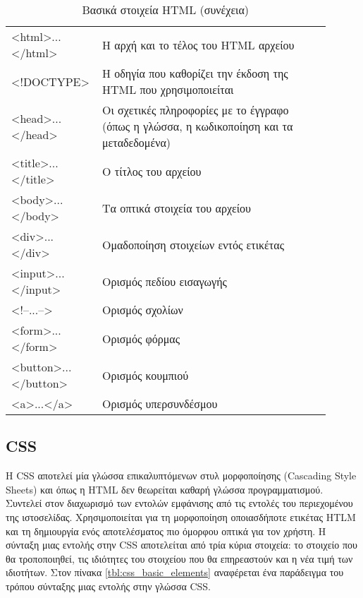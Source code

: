 \begin{longtable}{|p{0.2\linewidth}|p{0.7\linewidth}|} 
	\caption{Βασικά στοιχεία HTML} \label{tbl:html_basic_elements} \\
	\hline
	\endfirsthead
	\caption[{}]{Βασικά στοιχεία HTML (συνέχεια)} \\ 
	\endhead \endfoot 
	\textless{}html\textgreater{}...\textless{}/html\textgreater{} & Η αρχή και το τέλος του HTML αρχείου \\ \hline
	\textless{}!DOCTYPE\textgreater{} & Η οδηγία που καθορίζει την έκδοση της HTML που χρησιμοποιείται \\ \hline
	\textless{}head\textgreater{}...\textless{}/head\textgreater{} & Οι σχετικές πληροφορίες με το έγγραφο (όπως η γλώσσα, η κωδικοποίηση και τα μεταδεδομένα) \\ \hline
	\textless{}title\textgreater{}...\textless{}/title\textgreater{} & Ο τίτλος του αρχείου \\ \hline
	\textless{}body\textgreater{}...\textless{}/body\textgreater{} & Τα οπτικά στοιχεία του αρχείου \\ \hline
	\textless{}div\textgreater{}...\textless{}/div\textgreater{} & Ομαδοποίηση στοιχείων εντός ετικέτας \\ \hline
	\textless{}input\textgreater{}...\textless{}/input\textgreater{} & Ορισμός πεδίου εισαγωγής \\ \hline
	\textless{}!--...--\textgreater{} & Ορισμός σχολίων \\ \hline
	\textless{}form\textgreater{}...\textless{}/form\textgreater{} & Ορισμός φόρμας \\ \hline
	\textless{}button\textgreater{}...\textless{}/button\textgreater{} & Ορισμός κουμπιού \\ \hline
	\textless{}a\textgreater{}...\textless{}/a\textgreater{} & Ορισμός υπερσυνδέσμου \\ \hline
\end{longtable}

\subsection{CSS}
Η CSS αποτελεί μία γλώσσα επικαλυπτόμενων στυλ μορφοποίησης (Cascading Style Sheets) και όπως η HTML δεν θεωρείται καθαρή γλώσσα προγραμματισμού. Συντελεί στον διαχωρισμό των εντολών εμφάνισης από τις εντολές του περιεχομένου της ιστοσελίδας. Χρησιμοποιείται για τη μορφοποίηση οποιασδήποτε ετικέτας HTLM και τη δημιουργία ενός αποτελέσματος πιο όμορφου οπτικά για τον χρήστη. Η σύνταξη μιας εντολής στην CSS αποτελείται από τρία κύρια στοιχεία: το στοιχείο που θα τροποποιηθεί, τις ιδιότητες του στοιχείου που θα επηρεαστούν και η νέα τιμή των ιδιοτήτων. Στον πίνακα \ref{tbl:css_basic_elements} αναφέρεται ένα παράδειγμα του τρόπου σύνταξης μιας εντολής στην γλώσσα CSS.

